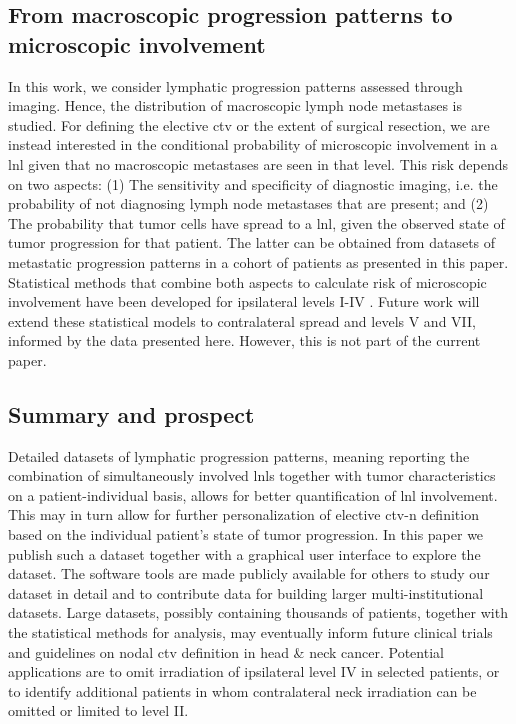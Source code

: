 \documentclass[\relativeRoot/main.tex]{subfiles}
\begin{document}
\subsection*{From macroscopic progression patterns to microscopic involvement}

In this work, we consider lymphatic progression patterns assessed through imaging. Hence, the distribution of macroscopic lymph node metastases is studied. For defining the elective \gls{ctv} or the extent of surgical resection, we are instead interested in the conditional probability of microscopic involvement in a \gls{lnl} given that no macroscopic metastases are seen in that level. This risk depends on two aspects: (1) The sensitivity and specificity of diagnostic imaging, i.e. the probability of not diagnosing lymph node metastases that are present; and (2) The probability that tumor cells have spread to a \gls{lnl}, given the observed state of tumor progression for that patient. The latter can be obtained from datasets of metastatic progression patterns in a cohort of patients as presented in this paper. Statistical methods that combine both aspects to calculate risk of microscopic involvement have been developed for ipsilateral levels I-IV \cite{pouymayou_bayesian_2019,ludwig_hidden_2021}. Future work will extend these statistical models to contralateral spread and levels V and VII, informed by the data presented here. However, this is not part of the current paper.

\subsection*{Summary and prospect}

Detailed datasets of lymphatic progression patterns, meaning reporting the combination of simultaneously involved \glspl{lnl} together with tumor characteristics on a patient-individual basis, allows for better quantification of \gls{lnl} involvement. This may in turn allow for further personalization of elective \gls{ctv-n} definition based on the individual patient's state of tumor progression. In this paper we publish such a dataset together with a graphical user interface to explore the dataset. The software tools are made publicly available for others to study our dataset in detail and to contribute data for building larger multi-institutional datasets. Large datasets, possibly containing thousands of patients, together with the statistical methods for analysis, may eventually inform future clinical trials and guidelines on nodal \gls{ctv} definition in head \& neck cancer. Potential applications are to omit irradiation of ipsilateral level IV in selected patients, or to identify additional patients in whom contralateral neck irradiation can be omitted or limited to level II.
\end{document}
